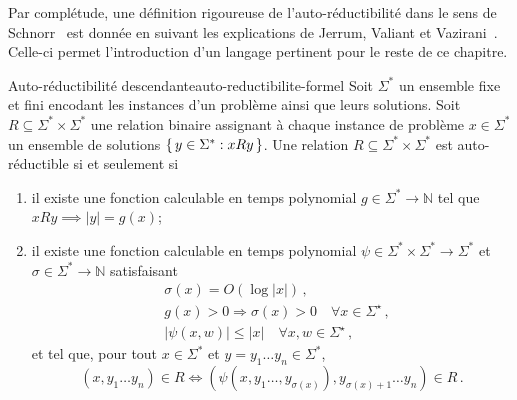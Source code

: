 Par complétude, une définition rigoureuse de l'auto-réductibilité dans le sens de Schnorr~\cite{schnorrOptimalAlgorithmsSelfReducible1976} est donnée en suivant les explications de Jerrum, Valiant et Vazirani~\cite{jerrumRandomGenerationCombinatorial1986}. Celle-ci permet l'introduction d'un langage pertinent pour le reste de ce chapitre.

\begin{maindefinition}{Auto-réductibilité descendante}{auto-reductibilite-formel}
    Soit $\Sigma^{*}$ un ensemble fixe et fini encodant les instances d'un problème ainsi que leurs solutions. Soit $R \subseteq \Sigma^{*} \times \Sigma^{*}$ une relation binaire assignant à chaque instance de problème $x \in \Sigma^{*}$ un ensemble de solutions $\set{ y \in \Sigma^{*} : xRy }$. Une relation $R \subseteq \Sigma^{*} \times \Sigma^{*}$ est auto-réductible si et seulement si
    \begin{enumerate}[(1)]
        \item il existe une fonction calculable en temps polynomial $g \in \Sigma^{*} \to \mathbb{N}$ tel que $xRy \implies \lvert y \rvert = g(x)$;
        \item il existe une fonction calculable en temps polynomial $\psi \in \Sigma^{*} \times \Sigma^{*} \to \Sigma^{*}$ et $\sigma \in \Sigma^{*} \to \mathbb{N}$ satisfaisant
        \begin{align*}
            & \sigma(x)=O(\log |x|) \,, \\
            & g(x)>0 \Rightarrow \sigma(x)>0 \quad \forall x \in \Sigma^{\star} \,, \\
            & |\psi(x, w)| \leqslant|x| \quad \forall x, w \in \Sigma^{\star} \,,
        \end{align*}
        et tel que, pour tout $x \in \Sigma^{*}$ et $y=y_1 \ldots y_n \in \Sigma^{*}$, 
        \begin{equation*}
            \left ( x, y_1 \ldots y_n \right ) \in R \Leftrightarrow \left ( \psi \left( x, y_1 \ldots, y_{\sigma(x)} \right), y_{\sigma(x)+1} \ldots y_n \right ) \in R \,.
        \end{equation*}
    \end{enumerate}
\end{maindefinition}

